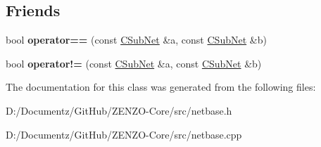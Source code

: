 \subsection*{Friends}
\begin{DoxyCompactItemize}
\item 
\mbox{\label{class_c_sub_net_a386ec849433fb808a6f5a4f97893b4cd}} 
bool {\bfseries operator==} (const \mbox{\hyperlink{class_c_sub_net}{C\+Sub\+Net}} \&a, const \mbox{\hyperlink{class_c_sub_net}{C\+Sub\+Net}} \&b)
\item 
\mbox{\label{class_c_sub_net_a009219cad6ef9a6d6da9b9a876e43b9d}} 
bool {\bfseries operator!=} (const \mbox{\hyperlink{class_c_sub_net}{C\+Sub\+Net}} \&a, const \mbox{\hyperlink{class_c_sub_net}{C\+Sub\+Net}} \&b)
\end{DoxyCompactItemize}


The documentation for this class was generated from the following files\+:\begin{DoxyCompactItemize}
\item 
D\+:/\+Documentz/\+Git\+Hub/\+Z\+E\+N\+Z\+O-\/\+Core/src/netbase.\+h\item 
D\+:/\+Documentz/\+Git\+Hub/\+Z\+E\+N\+Z\+O-\/\+Core/src/netbase.\+cpp\end{DoxyCompactItemize}
